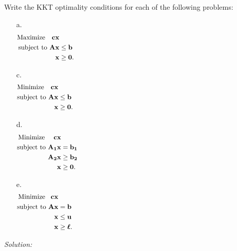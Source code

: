 \documentclass[12pt]{amsart}
\begin{document}
\subsection{}
Write the KKT optimality conditions for each of the following problems:
\begin{enumerate}
	\item[a.] \begin{align*}
		\text{Maximize }\,\,\ \mathbf{cx} & \hspace{75ex}\\
		\text{subject to  } \mathbf{Ax} &\leq \mathbf{b} \\
		\mathbf{x} &\geq \mathbf{0}.
	\end{align*} \vspace{-5ex}
	\item[c.] \begin{align*}
		\text{Minimize }\,\,\ \mathbf{cx} & \hspace{75ex}\\
		\text{subject to  } \mathbf{Ax} &\leq \mathbf{b} \\
		\mathbf{x} &\geq \mathbf{0}.
	\end{align*} \vspace{-5ex}
	\item[d.]\begin{align*}
		\text{Minimize }\quad \mathbf{cx} & \hspace{75ex}\\
		\text{subject to  } \mathbf{A_1x} &= \mathbf{b_1} \\
		\mathbf{A_2x} &\geq \mathbf{b_2} \\
		\mathbf{x} &\geq \mathbf{0}.
	\end{align*} \vspace{-5ex}
	\item[e.] \begin{align*}
		\text{Minimize }\,\ \mathbf{cx} & \hspace{75ex}\\
		\text{subject to  } \mathbf{Ax} &= \mathbf{b} \\
		\mathbf{x} &\leq \mathbf{u} \\
		\mathbf{x} &\geq \boldsymbol{\ell}.
	\end{align*} \vspace{-5ex}
\end{enumerate}

\bigskip
\textit{Solution:}
\end{document}
